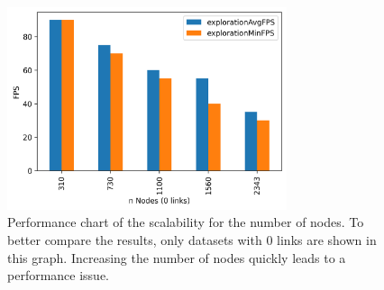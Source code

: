 \begin{table}[!hbt]
     \caption[Results from the performance evaluation.]{Results from the performance evaluation, separated into duration of the layout phase in seconds and render performance in FPS during the exploration phase. Test setup: Ryzen 7 3700X + Radeon RX 590.}
     \label{table:resultFPS}
\end{table}

\begin{figure}[!hbt]
    \centering
    \includegraphics[width=0.73\textwidth]{graphics/performanceAnalysisNodes3.png}
    \caption[Performance chart of the scalability for the number of nodes.]{Performance chart of the scalability for the number of nodes. To better compare the results, only datasets with 0 links are shown in this graph. Increasing the number of nodes quickly leads to a performance issue.} 
    \label{fig:performanceNodes} 
\end{figure}

